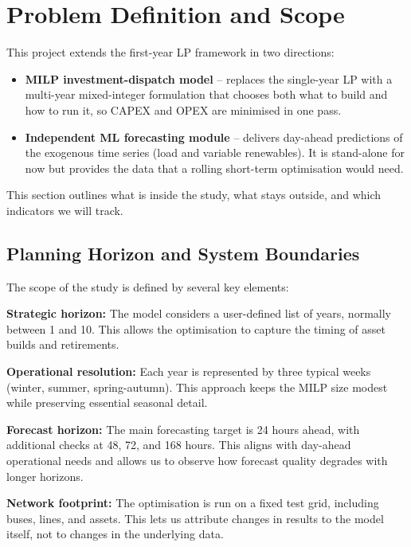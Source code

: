 
\section{Problem Definition and Scope}

This project extends the first-year LP framework in two directions:
\begin{itemize}
    \item \textbf{MILP investment-dispatch model} – replaces the single-year LP with a multi-year 
    mixed-integer formulation that chooses both what to build and how to run it, so CAPEX and 
    OPEX are minimised in one pass.
    \item \textbf{Independent ML forecasting module} – delivers day-ahead predictions of the 
    exogenous time series (load and variable renewables). It is stand-alone for now but provides 
    the data that a rolling short-term optimisation would need.
\end{itemize}

This section outlines what is inside the study, what stays outside, and which indicators we will track.

\subsection{Planning Horizon and System Boundaries}

The scope of the study is defined by several key elements:

\textbf{Strategic horizon:} The model considers a user-defined list of years, normally between 1 and 10. 
This allows the optimisation to capture the timing of asset builds and retirements.

\textbf{Operational resolution:} Each year is represented by three typical weeks (winter, summer, 
spring-autumn). This approach keeps the MILP size modest while preserving essential seasonal detail.

\textbf{Forecast horizon:} The main forecasting target is 24 hours ahead, with additional checks at 48, 72, and 168 hours. This aligns with day-ahead operational needs and allows us to observe how forecast quality degrades with longer horizons.

\textbf{Network footprint:} The optimisation is run on a fixed test grid, including buses, lines, and assets. This lets us attribute changes in results to the model itself, not to changes in the underlying data.

